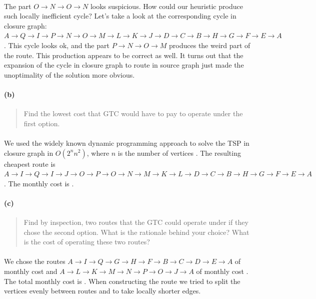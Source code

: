 \paragraph{}
The part $ O \rightarrow N \rightarrow O \rightarrow N $ looks suspicious. How could our heuristic produce such locally inefficient cycle? Let's take a look at the corresponding cycle in closure graph: $ A \rightarrow Q \rightarrow I \rightarrow P \rightarrow N \rightarrow O \rightarrow M \rightarrow L \rightarrow K \rightarrow J \rightarrow D \rightarrow C \rightarrow B \rightarrow H \rightarrow G \rightarrow F \rightarrow E \rightarrow A $. This cycle looks ok, and the part $ P \rightarrow N \rightarrow O \rightarrow M $ produces the weird part of the route. This production appears to be correct as well. It turns out that the expansion of the cycle in closure graph to route in source graph just made the unoptimality of the solution more obvious.

\paragraph{(b)}
\begin{quote}
Find the lowest cost that GTC would have to pay to operate under the first option.
\end{quote}

\paragraph{}
We used the widely known dynamic programming approach to solve the TSP in closure graph in $O(2^n n^2)$, where $n$ is the number of vertices \cite{karp62}. The resulting cheapest route is $ A \rightarrow I \rightarrow Q \rightarrow I \rightarrow J \rightarrow O \rightarrow P \rightarrow O \rightarrow N \rightarrow M \rightarrow K \rightarrow L \rightarrow D \rightarrow C \rightarrow B \rightarrow H \rightarrow G \rightarrow F \rightarrow E \rightarrow A $. The monthly cost is .

\paragraph{(c)}
\begin{quote}
Find by inspection, two routes that the GTC could operate under if they chose the second option. What is the rationale behind your choice? What is the cost of
operating these two routes?
\end{quote}

\paragraph{}
We chose the routes $ A \rightarrow I \rightarrow Q \rightarrow G \rightarrow H \rightarrow F \rightarrow B \rightarrow C \rightarrow D \rightarrow E \rightarrow A $ of monthly cost  and $ A \rightarrow L \rightarrow K \rightarrow M \rightarrow N \rightarrow P \rightarrow O \rightarrow J \rightarrow A $ of monthly cost . The total monthly cost is . When constructing the route we tried to split the vertices evenly between routes and to take locally shorter edges.

